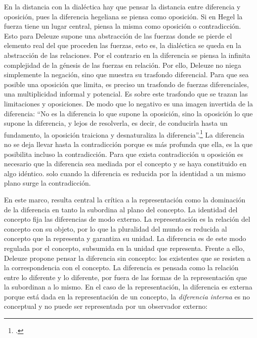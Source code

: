 \documentclass{book}
\begin{document}
En la distancia con la dialéctica hay que pensar la distancia entre
diferencia y oposición, pues la diferencia hegeliana se piensa como
oposición. Si en Hegel la fuerza tiene un lugar central, piensa la misma
como oposición o contradicción. Esto para Deleuze supone una abstracción
de las fuerzas donde se pierde el elemento real del que proceden las
fuerzas, esto es, la dialéctica se queda en la abstracción de las
relaciones. Por el contrario en la diferencia se piensa la infinita
complejidad de la génesis de las fuerzas en relación. Por ello, Deleuze
no niega simplemente la negación, sino que muestra su trasfondo
diferencial. Para que sea posible una oposición que limita, es preciso
un trasfondo de fuerzas diferenciales, una multiplicidad informal y
potencial. Es sobre este trasfondo que se trazan las limitaciones y
oposiciones. De modo que lo negativo es una imagen invertida de la
diferencia: \enquote{No es la diferencia lo que supone la oposición, sino la
oposición lo que supone la diferencia, y lejos de resolverla, es decir,
de conducirla hasta un fundamento, la oposición traiciona y
desnaturaliza la diferencia}.\footcite[94]{deleuze2005a} La diferencia no se deja
llevar hasta la contradicción porque es más profunda que ella, es la que
posibilita incluso la contradicción. Para que exista contradicción u
oposición es necesario que la diferencia sea mediada por el concepto y
se haya constituido en algo idéntico. solo cuando la diferencia es
reducida por la identidad a un mismo plano surge la contradicción.

En este marco, resulta central la crítica a la representación como la
dominación de la diferencia en tanto la subordina al plano del concepto.
La identidad del concepto fija las diferencias de modo externo. La
representación es la relación del concepto con su objeto, por lo que la
pluralidad del mundo es reducida al concepto que la representa y
garantiza su unidad. La diferencia es de este modo regulada por el
concepto, subsumida en la unidad que representa. Frente a ello, Deleuze
propone pensar la diferencia sin concepto: los existentes que se
resisten a la correspondencia con el concepto. La diferencia es pensada
como la relación entre lo diferente y lo diferente, por fuera de las
formas de la representación que la subordinan a lo mismo. En el caso de
la representación, la diferencia es externa porque está dada en la
representación de un concepto, la \emph{diferencia interna} es no
conceptual y no puede ser representada por un observador externo:
\end{document}
